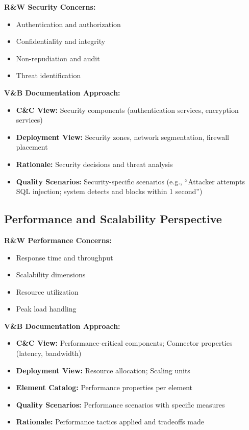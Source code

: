 \documentclass[11pt]{article}
\begin{document}
\begin{perspbox}
\textbf{R\&W Security Concerns:}
\begin{itemize}[nosep]
    \item Authentication and authorization
    \item Confidentiality and integrity
    \item Non-repudiation and audit
    \item Threat identification
\end{itemize}

\textbf{V\&B Documentation Approach:}
\begin{itemize}
    \item \textbf{C\&C View:} Security components (authentication services, encryption services)
    \item \textbf{Deployment View:} Security zones, network segmentation, firewall placement
    \item \textbf{Rationale:} Security decisions and threat analysis
    \item \textbf{Quality Scenarios:} Security-specific scenarios (e.g., ``Attacker attempts SQL injection; system detects and blocks within 1 second'')
\end{itemize}
\end{perspbox}

\subsection{Performance and Scalability Perspective}

\begin{perspbox}
\textbf{R\&W Performance Concerns:}
\begin{itemize}[nosep]
    \item Response time and throughput
    \item Scalability dimensions
    \item Resource utilization
    \item Peak load handling
\end{itemize}

\textbf{V\&B Documentation Approach:}
\begin{itemize}
    \item \textbf{C\&C View:} Performance-critical components; Connector properties (latency, bandwidth)
    \item \textbf{Deployment View:} Resource allocation; Scaling units
    \item \textbf{Element Catalog:} Performance properties per element
    \item \textbf{Quality Scenarios:} Performance scenarios with specific measures
    \item \textbf{Rationale:} Performance tactics applied and tradeoffs made
\end{itemize}
\end{perspbox}
\end{document}

